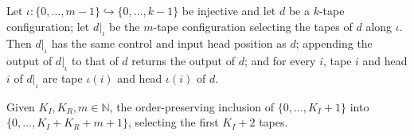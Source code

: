 \begin{lemma}
\label{Complexity.sph_select_fields}
\leanok
{}
Let $\iota:\{0,\dots,m-1\}\hookrightarrow\{0,\dots,k-1\}$ be injective and let $d$ be a $k$-tape
configuration; let $d|_\iota$ be the $m$-tape configuration selecting the tapes of $d$ along
$\iota$. Then $d|_\iota$ has the same control and input head position as $d$; appending the output
of $d|_\iota$ to that of $d$ returns the output of $d$; and for every $i$, tape $i$ and head $i$ of
$d|_\iota$ are tape $\iota(i)$ and head $\iota(i)$ of $d$.
\end{lemma}

\begin{definition}
\label{Complexity.sphInitSel}
\leanok
Given $K_I,K_R,m\in\mathbb{N}$, the order-preserving inclusion of $\{0,\dots,K_I+1\}$ into
$\{0,\dots,K_I+K_R+m+1\}$, selecting the first $K_I+2$ tapes.
\end{definition}

